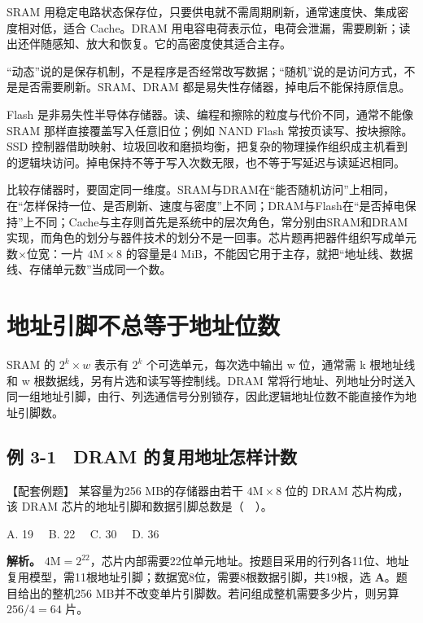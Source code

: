 SRAM 用稳定电路状态保存位，只要供电就不需周期刷新，通常速度快、集成密度相对低，适合 Cache。DRAM 用电容电荷表示位，电荷会泄漏，需要刷新；读出还伴随感知、放大和恢复。它的高密度使其适合主存。

``动态''说的是保存机制，不是程序是否经常改写数据；``随机''说的是访问方式，不是是否需要刷新。SRAM、DRAM 都是易失性存储器，掉电后不能保持原信息。

Flash 是非易失性半导体存储器。读、编程和擦除的粒度与代价不同，通常不能像 SRAM 那样直接覆盖写入任意旧位；例如 NAND Flash 常按页读写、按块擦除。SSD 控制器借助映射、垃圾回收和磨损均衡，把复杂的物理操作组织成主机看到的逻辑块访问。掉电保持不等于写入次数无限，也不等于写延迟与读延迟相同。

比较存储器时，要固定同一维度。SRAM与DRAM在“能否随机访问”上相同，在“怎样保持一位、是否刷新、速度与密度”上不同；DRAM与Flash在“是否掉电保持”上不同；Cache与主存则首先是系统中的层次角色，常分别由SRAM和DRAM实现，而角色的划分与器件技术的划分不是一回事。芯片题再把器件组织写成单元数\ensuremath{\times}位宽：一片 \(4\mathrm M\times8\) 的容量是4 MiB，不能因它用于主存，就把``地址线、数据线、存储单元数''当成同一个数。

\section{地址引脚不总等于地址位数}\label{CO03-04}

SRAM 的 \(2^k\times w\) 表示有 \(2^k\) 个可选单元，每次选中输出 w 位，通常需 k 根地址线和 w 根数据线，另有片选和读写等控制线。DRAM 常将行地址、列地址分时送入同一组地址引脚，由行、列选通信号分别锁存，因此逻辑地址位数不能直接作为地址引脚数。

\subsection{例 3-1　DRAM 的复用地址怎样计数}\label{CO03-05}

\begin{example}[配套例题]

【配套例题】 某容量为256 MB的存储器由若干 \(4\mathrm M\times8\) 位的 DRAM 芯片构成，该 DRAM 芯片的地址引脚和数据引脚总数是（　）。

A. 19　 B. 22　 C. 30　 D. 36

\end{example}

\textbf{解析。} \(4\mathrm M=2^{22}\)，芯片内部需要22位单元地址。按题目采用的行列各11位、地址复用模型，需11根地址引脚；数据宽8位，需要8根数据引脚，共19根，选 \textbf{A}。题目给出的整机256 MB并不改变单片引脚数。若问组成整机需要多少片，则另算 \(256/4=64\) 片。


